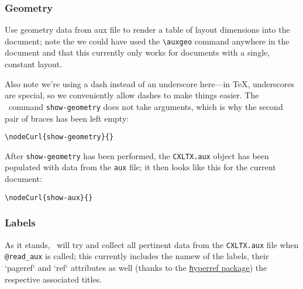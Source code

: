 \subsubsection{Geometry}\label{geo}


\auxgeo

Use geometry data from aux file to render a table of layout dimensions into the document;
note the we could have used the \verb#\auxgeo# command anywhere in the document and that
this currently only works for documents with a single, constant layout.

Also note we're using a dash instead of an underscore here---in \TeX, underscores are special, so
we conveniently allow dashes to make things easier. The \CXLTX\ command \verb#show-geometry# does
not take arguments, which is why the second pair of braces has been left empty:

\begin{verbatim}
\nodeCurl{show-geometry}{}
\end{verbatim}


After \verb#show-geometry# has been performed, the \verb#CXLTX.aux# object has been populated with data from the
\verb#aux# file; it then looks like this for the current document:


\begin{verbatim}
\nodeCurl{show-aux}{}
\end{verbatim}



\subsubsection{Labels}\label{labels}

As it stands, \CXLTX\ will try and collect all pertinent data from the \verb#CXLTX.aux# file when
\verb#@read_aux# is called; this currently includes the namew of the labels, their `pageref` and `ref`
attributes as well (thanks to the \href{http://ftp.gwdg.de/pub/ctan/macros/latex/contrib/hyperref/doc/manual.pdf}{{\texttt hyperref} package})
the respective associated titles.

